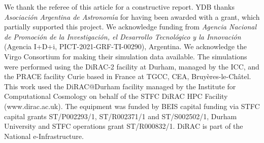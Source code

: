 \documentclass[baaa]{baaa}
\begin{document}
\begin{acknowledgement}
We thank the referee of this article for a constructive report.
YDB thanks {\it Asociaci\'on Argentina de Astronom\'{\i}a} for having been awarded with a grant, which partially supported this project. 
We acknowledge funding from {\it Agencia Nacional de Promoci\'on de la Investigaci\'on, el Desarrollo Tecnol\'ogico y la Innovaci\'on} (Agencia I+D+i, PICT-2021-GRF-TI-00290), Argentina. We acknowledge the Virgo Consortium for making their simulation data available. The {} simulations were performed using the DiRAC-2 facility at Durham, managed by the ICC, and the PRACE facility Curie based in France at TGCC, CEA, Bruy\`{e}res-le-Ch\^{a}tel. This work used the DiRAC@Durham facility managed by the Institute for Computational Cosmology on behalf of the STFC DiRAC HPC Facility (www.dirac.ac.uk). The equipment was funded by BEIS capital funding via STFC capital grants ST/P002293/1, ST/R002371/1 and ST/S002502/1, Durham University and STFC operations grant ST/R000832/1. DiRAC is part of the National e-Infrastructure.
\end{acknowledgement}



\small


\end{document}
